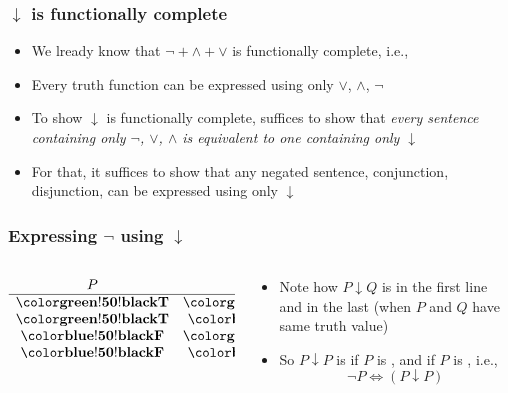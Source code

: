 \begin{frame}
  \frametitle{$\downarrow$ is functionally complete}

\begin{itemize}[<+->]
\item We lready know that ${\lnot} + {\land} + {\lor}$ is functionally complete, i.e.,
\item Every truth function can be expressed using only $\lor$, $\land$, $\lnot$
\item To show $\downarrow$ is functionally complete, suffices to
  show that \emph{every sentence containing only $\lnot$, $\lor$, $\land$ is
   equivalent to one containing only $\downarrow$}
\item For that, it suffices to show that any negated sentence,
  conjunction, disjunction, can be expressed using only $\downarrow$
\end{itemize}

\end{frame}

\begin{frame}
    \frametitle{Expressing $\lnot$ using $\downarrow$}

\begin{columns}
\begin{column}{3cm}
\[\begin{array}{cc|c}
P & Q & (P \downarrow Q)\\
\hline
\True & \True & \False\\
\True & \False & \False\\
\False & \True & \False\\
\False & \False & \True
\end{array}\]
\end{column}
\begin{column}{7cm}
\begin{itemize}
\item Note how $P \downarrow Q$ is \False{} in the first line and \True{} in the last (when $P$ and $Q$ have same truth value)
\item So $P \downarrow P$ is \False{} if $P$ is \True, and \True{} if $P$ is \False, i.e., \[
\lnot P \Leftrightarrow (P \downarrow P)
\]
\end{itemize}
\end{column}
\end{columns}

\end{frame}

